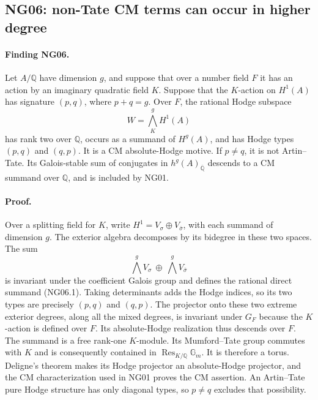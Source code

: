 \subsection{NG06: non-Tate CM terms can occur in higher degree}
\label{NG06}

\paragraph{Finding NG06.}
Let $A/\mathbb Q$ have dimension $g$, and suppose that over a number
field $F$ it has an action by an imaginary quadratic field $K$.
Suppose that the $K$-action on $H^1(A)$ has signature $(p,q)$, where
$p+q=g$.  Over $F$, the rational Hodge subspace
\[
                         W=\bigwedge_K^g H^1(A)               \tag{NG06.1}
\]
has rank two over $\mathbb Q$, occurs as a summand of $H^g(A)$,
and has Hodge types $(p,q)$ and $(q,p)$.  It is a CM absolute-Hodge
motive.  If $p\ne q$, it is not Artin--Tate.  Its Galois-stable sum of
conjugates in $h^g(A)_{\overline{\mathbb Q}}$ descends to a CM summand
over $\mathbb Q$, and is included by NG01.

\paragraph{Proof.}
Over a splitting field for $K$, write
$H^1=V_\sigma\oplus V_{\bar\sigma}$, with each summand of dimension
$g$.  The exterior algebra decomposes by its bidegree in these two
spaces.  The sum
\[
                      \bigwedge^g V_\sigma\ \oplus\
                      \bigwedge^g V_{\bar\sigma}
\]
is invariant under the coefficient Galois group and defines the
rational direct summand (NG06.1).  Taking determinants adds the Hodge
indices, so its two types are precisely $(p,q)$ and $(q,p)$.
The projector onto these two extreme exterior degrees, along all
the mixed degrees, is invariant under $G_F$ because the $K$-action
is defined over $F$.  Its absolute-Hodge realization thus descends
over $F$.
The summand is a free rank-one $K$-module.  Its Mumford--Tate group
commutes with $K$ and is consequently contained in
$\operatorname{Res}_{K/\mathbb Q}\mathbb G_m$.  It is therefore a
torus.  Deligne's theorem makes its Hodge projector an absolute-Hodge
projector, and the CM characterization used in NG01 proves the CM
assertion.  An Artin--Tate pure Hodge structure has only diagonal
types, so $p\ne q$ excludes that possibility.

